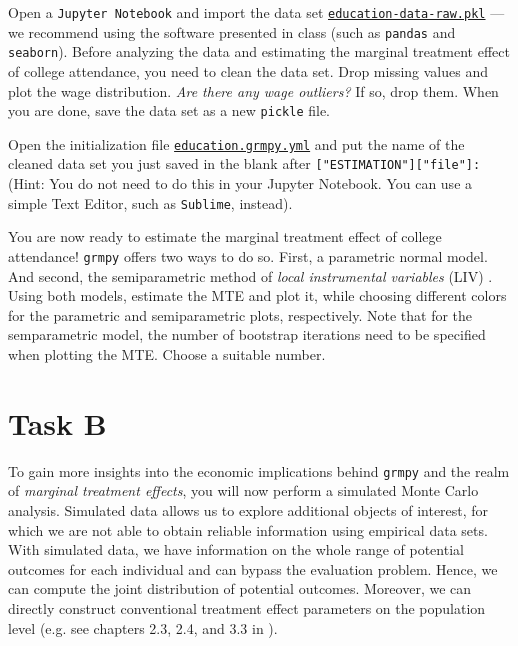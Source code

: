 \begin{boenumerate}

  \item Open a \texttt{Jupyter Notebook} and import the data set \href{https://github.com/HumanCapitalAnalysis/microeconometrics/blob/prset_grmpy/problem-sets/04-generalized-roy-model/data/education_data_raw.pkl}{\texttt{education-data-raw.pkl}} --- we recommend using the software presented in class (such as \texttt{pandas} and \texttt{seaborn}). 
  Before analyzing the data and estimating the marginal treatment effect of college attendance, you need to clean the data set. Drop missing values and plot the wage distribution. \emph{Are there any wage outliers?} If so, drop them.
  When you are done, save the data set as a new \texttt{pickle} file.
  
   \item Open the initialization file \href{https://github.com/HumanCapitalAnalysis/microeconometrics/blob/prset_grmpy/problem-sets/04-generalized-roy-model/sources/education.grmpy.yml}{\texttt{education.grmpy.yml}} and put the name of the cleaned data set you just saved in the blank after \texttt{["ESTIMATION"]["file"]:} (Hint: You do not need to do this in your Jupyter Notebook. You can use a simple Text Editor, such as \texttt{Sublime}, instead).
   
   \item You are now ready to estimate the marginal treatment effect of college attendance! \texttt{grmpy} offers two ways to do so. First, a parametric normal model. And second, the semiparametric method of \emph{local instrumental variables} (LIV) \citep{Heckman.2006d}.
   Using both models, estimate the MTE and plot it, while choosing different colors for the parametric and semiparametric plots, respectively. Note that for the semparametric model, the number of bootstrap iterations need to be specified when plotting the MTE. Choose a suitable number.

\end{boenumerate}


\section*{Task B}

   To gain more insights into the economic implications behind \texttt{grmpy} and the realm of \emph{marginal treatment effects}, you will now perform a simulated Monte Carlo analysis. 
   Simulated data allows us to explore additional objects of interest, for which we are not able to obtain reliable information using empirical data sets. With simulated data, we have information on the whole range of potential outcomes for each individual and can bypass the evaluation problem. Hence, we can compute the joint distribution of potential outcomes. Moreover, we can directly construct conventional treatment effect parameters on the population level (e.g. see chapters 2.3, 2.4, and 3.3 in \cite{Heckman.2007e}).\\

